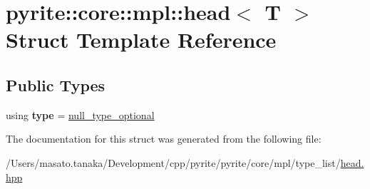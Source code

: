 \hypertarget{structpyrite_1_1core_1_1mpl_1_1head}{}\section{pyrite\+:\+:core\+:\+:mpl\+:\+:head$<$ T $>$ Struct Template Reference}
\label{structpyrite_1_1core_1_1mpl_1_1head}
\subsection*{Public Types}
\begin{DoxyCompactItemize}
\item 
\mbox{\label{structpyrite_1_1core_1_1mpl_1_1head_a4fb0efff071569af23d9d0da6506e5fa}} 
using {\bfseries type} = \mbox{\hyperlink{structpyrite_1_1core_1_1mpl_1_1type__optional_3_4}{null\+\_\+type\+\_\+optional}}
\end{DoxyCompactItemize}


The documentation for this struct was generated from the following file\+:\begin{DoxyCompactItemize}
\item 
/\+Users/masato.\+tanaka/\+Development/cpp/pyrite/pyrite/core/mpl/type\+\_\+list/\mbox{\hyperlink{core_2mpl_2type__list_2head_8hpp}{head.\+hpp}}\end{DoxyCompactItemize}

